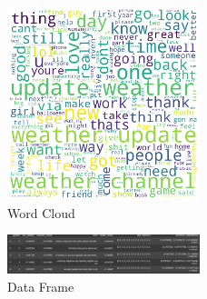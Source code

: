 \documentclass[a4paper,11pt]{article}
\begin{document}
\begin{figure}[h!]
    \centering
    \includegraphics[width=0.5\textwidth]{word_cloud_a2.png}
    \caption{Word Cloud}
    \label{fig:wc}
\end{figure}

\begin{figure}[h!]
    \centering
    \includegraphics[width=0.5\textwidth]{df.png}
    \caption{Data Frame}
    \label{fig:df}
\end{figure}


\newpage

\nocite{*}
\end{document}
